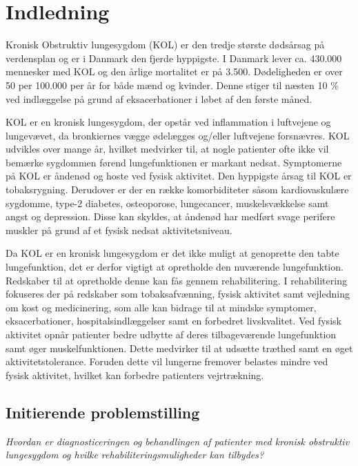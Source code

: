 \chapter{Indledning} 
Kronisk Obstruktiv lungesygdom (KOL) er den tredje største dødsårsag på verdensplan og er i Danmark den fjerde hyppigste. I Danmark lever ca. 430.000 mennesker med KOL og den årlige mortalitet er på 3.500. Dødeligheden er over 50 per 100.000 per år for både mænd og kvinder. Denne stiger til næsten 10 \% ved indlæggelse på grund af eksacerbationer i løbet af den første måned. 

KOL er en kronisk lungesygdom, der opstår ved inflammation i luftvejene og lungevævet, da bronkiernes vægge ødelægges og/eller luftvejene forsnævres. KOL udvikles over mange år, hvilket medvirker til, at nogle patienter ofte ikke vil bemærke sygdommen førend lungefunktionen er markant nedsat. Symptomerne på KOL er åndenød og hoste ved fysisk aktivitet. Den hyppigste årsag til KOL er tobaksrygning. 
Derudover er der en række komorbiditeter såsom kardiovaskulære sygdomme, type-2 diabetes, osteoporose, lungecancer, muskelsvækkelse samt angst og depression. Disse kan skyldes, at åndenød har medført svage perifere muskler på grund af et fysisk nedsat aktivitetsniveau.

Da KOL er en kronisk lungesygdom er det ikke muligt at genoprette den tabte lungefunktion, det er derfor vigtigt at opretholde den nuværende lungefunktion. Redskaber til at opretholde denne kan fås gennem rehabilitering. I rehabilitering fokuseres der på redskaber som tobaksafvænning, fysisk aktivitet samt vejledning om kost og medicinering, som alle kan bidrage til at mindske symptomer, eksacerbationer, hospitalsindlæggelser samt en forbedret livskvalitet. 
Ved fysisk aktivitet opnår patienter bedre udbytte af deres tilbageværende lungefunktion samt øger muskelfunktionen. Dette medvirker til at udsætte træthed samt en øget aktivitetstolerance. Foruden dette vil lungerne fremover belastes mindre ved fysisk aktivitet, hvilket kan forbedre patienters vejrtrækning. 

\section{Initierende problemstilling}
\textit{Hvordan er diagnosticeringen og behandlingen af patienter med kronisk obstruktiv lungesygdom og hvilke rehabiliteringsmuligheder kan tilbydes?}